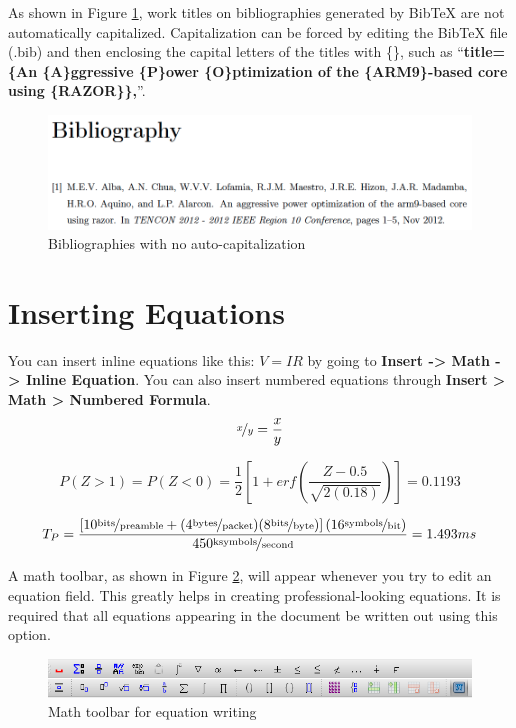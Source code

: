 \documentclass[english]{upeeei}
\begin{document}
As shown in Figure \ref{fig:Bibliographies-with-no}, work titles
on bibliographies generated by Bib\TeX{} are not automatically capitalized.
Capitalization can be forced by editing the Bib\TeX{} file (.bib) and
then enclosing the capital letters of the titles with \{\}, such as
``\textbf{title=\{An \{A\}ggressive \{P\}ower \{O\}ptimization of
the \{ARM9\}-based core using \{RAZOR\}\},}''.

\begin{figure}[H]
\begin{centering}
\includegraphics[width=1\columnwidth]{images/bibliography}
\par\end{centering}
\caption{Bibliographies with no auto-capitalization \label{fig:Bibliographies-with-no}}

\end{figure}


\section{Inserting Equations}

You can insert inline equations like this: $V=IR$\textbf{ }by going
to \textbf{Insert -\textgreater{} Math -\textgreater{} Inline Equation}.
You can also insert numbered equations through \textbf{Insert \textgreater{}
Math \textgreater{} Numbered Formula}. 
\begin{equation}
\nicefrac{x}{y}=\frac{x}{y}
\end{equation}

\begin{equation}
P(Z>1)=P(Z<0)=\frac{1}{2}\left[1+erf\left(\frac{Z-0.5}{\sqrt{2(0.18)}}\right)\right]=0.1193\label{eq:1}
\end{equation}

\begin{equation}
T_{P}=\frac{\left[10\unitfrac{bits}{preamble}+(4\unitfrac{bytes}{packet})(8\unitfrac{bits}{byte})\right](16\unitfrac{symbols}{bit})}{450\unitfrac{ksymbols}{second}}=1.493ms\label{eq:4-1}
\end{equation}

A math toolbar, as shown in Figure \ref{fig:Math-toolbar-for}, will
appear whenever you try to edit an equation field. This greatly helps
in creating professional-looking equations. It is required that all
equations appearing in the document be written out using this option.

\begin{figure}[H]
\begin{centering}
\includegraphics[width=0.9\columnwidth]{images/equations}
\par\end{centering}
\caption{Math toolbar for equation writing\label{fig:Math-toolbar-for}}

\end{figure}

\cleardoublepage
\end{document}
